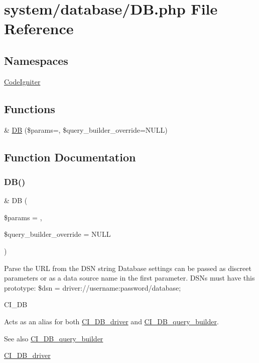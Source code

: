 \hypertarget{_d_b_8php}{}\section{system/database/\+DB.php File Reference}
\label{_d_b_8php}
\subsection*{Namespaces}
\begin{DoxyCompactItemize}
\item 
 \mbox{\hyperlink{namespace_code_igniter}{Code\+Igniter}}
\end{DoxyCompactItemize}
\subsection*{Functions}
\begin{DoxyCompactItemize}
\item 
\& \mbox{\hyperlink{_d_b_8php_a3faf383c8f1087c53bac95e803afed93}{DB}} (\$params=\textquotesingle{}\textquotesingle{}, \$query\+\_\+builder\+\_\+override=N\+U\+LL)
\end{DoxyCompactItemize}


\subsection{Function Documentation}
\mbox{\label{_d_b_8php_a3faf383c8f1087c53bac95e803afed93}} 
\subsubsection{\texorpdfstring{D\+B()}{DB()}}
{\footnotesize\ttfamily \& DB (\begin{DoxyParamCaption}\item[{}]{\$params = {\ttfamily \textquotesingle{}\textquotesingle{}},  }\item[{}]{\$query\+\_\+builder\+\_\+override = {\ttfamily NULL} }\end{DoxyParamCaption})}

Parse the U\+RL from the D\+SN string Database settings can be passed as discreet parameters or as a data source name in the first parameter. D\+S\+Ns must have this prototype\+: \$dsn = \textquotesingle{}driver\+://username\+:password/database\textquotesingle{};

C\+I\+\_\+\+DB

Acts as an alias for both \mbox{\hyperlink{class_c_i___d_b__driver}{C\+I\+\_\+\+D\+B\+\_\+driver}} and \mbox{\hyperlink{class_c_i___d_b__query__builder}{C\+I\+\_\+\+D\+B\+\_\+query\+\_\+builder}}.

\begin{DoxySeeAlso}{See also}
\mbox{\hyperlink{class_c_i___d_b__query__builder}{C\+I\+\_\+\+D\+B\+\_\+query\+\_\+builder}} 

\mbox{\hyperlink{class_c_i___d_b__driver}{C\+I\+\_\+\+D\+B\+\_\+driver}}
\end{DoxySeeAlso}
